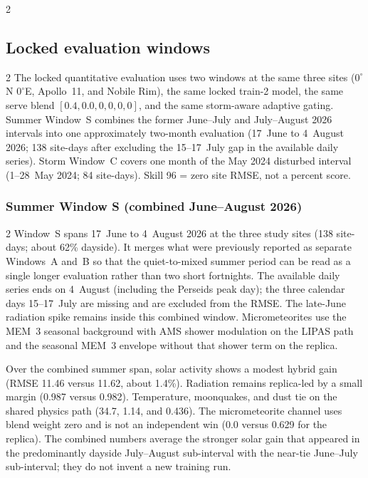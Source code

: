 \begin{multicols}{2}
\subsection{Locked evaluation windows}

\begin{multicols}{2}
The locked quantitative evaluation uses two windows at the same three sites ($0^{\circ}$N $0^{\circ}$E, Apollo~11, and Nobile Rim), the same locked train-2 model, the same serve blend $[0.4,0.0,0,0,0,0]$, and the same storm-aware adaptive gating. Summer Window~S combines the former June--July and July--August 2026 intervals into one approximately two-month evaluation (17~June to 4~August 2026; 138 site-days after excluding the 15--17~July gap in the available daily series). Storm Window~C covers one month of the May 2024 disturbed interval (1--28~May 2024; 84 site-days). Skill 96 = zero site RMSE, not a percent score.
\end{multicols}

\subsubsection{Summer Window S (combined June--August 2026)}

\begin{multicols}{2}
Window~S spans 17~June to 4~August 2026 at the three study sites (138 site-days; about 62\% dayside). It merges what were previously reported as separate Windows~A and~B so that the quiet-to-mixed summer period can be read as a single longer evaluation rather than two short fortnights. The available daily series ends on 4~August (including the Perseids peak day); the three calendar days 15--17~July are missing and are excluded from the RMSE. The late-June radiation spike remains inside this combined window. Micrometeorites use the MEM~3 seasonal background with AMS shower modulation on the LIPAS path and the seasonal MEM~3 envelope without that shower term on the replica.

Over the combined summer span, solar activity shows a modest hybrid gain (RMSE 11.46 versus 11.62, about 1.4\%). Radiation remains replica-led by a small margin (0.987 versus 0.982). Temperature, moonquakes, and dust tie on the shared physics path (34.7, 1.14, and 0.436). The micrometeorite channel uses blend weight zero and is not an independent win (0.0 versus 0.629 for the replica). The combined numbers average the stronger solar gain that appeared in the predominantly dayside July--August sub-interval with the near-tie June--July sub-interval; they do not invent a new training run.
\end{multicols}


\end{multicols}
